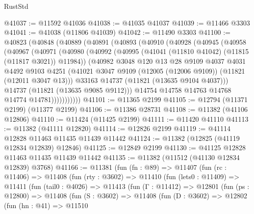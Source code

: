 \begin{lexlean}{RustStd}
\begin{coremodule}
@41037 := @11592 @41036
@41038 := @41035 @41037
@41039 := @11466 @3303
@41041 := @41038 (@11806 @41039)
@41042 := @11490 @3303
@41100 := @40823
    (@40848
      (@40889
        (@40891
          (@40893
            (@40910
              (@40928
                (@40945
                  (@40958
                    (@40967
                      (@40971
                        (@40980
                          (@40992
                            (@40995 (@41041 (@11810 @41042) (@11815 (@11817 @3021)) @11984))
                            (@40982
                              @3048
                              @120
                              @13
                              @28
                              @9109
                              @4037
                              @4031
                              @4492
                              @9103
                              @4251
                              (@41021
                                @3047
                                @9109
                                (@12005 (@12006 @9109))
                                (@11821 (@12011 @3047 @13)))
                              @33163
                              @14737
                              (@11821 (@13635 @9104 @4037)))
                            @14737
                            (@11821 (@13635 @9085 @9112)))
                          @14754
                          @14758
                          @14763
                          @14768
                          @14774
                          @14781)))))))))))
@41101 := @11365 @2199
@41105 := @12794 (@11371 @2199) (@11377 @2199)
@41106 := @11386 @28731
@41108 := @11382 (@41106 @12806)
@41110 := @11424 (@11425 @2199)
@41111 := @11420 @41110
@41113 := @11382 (@41111 @12820)
@41114 := @12826 @2199
@41119 := @41114 @12828 @11463 @11435 @11439 @11442
@41124 := @11382 (@12825 (@41119 @12834 @12839) @12846)
@41125 := @12849 @2199
@41130 := @41125 @12828 @11463 @11435 @11439 @11442
@41135 := @11382 (@11512 (@41130 @12834 @12839) @3768)
@41166 := @11381
    (fun (fn : @89) =>
    @11407
      (fun (rc : @11406) =>
      @11408
        (fun (rty : @3602) =>
        @11410
          (fun (lets0 : @11409) =>
          @11411
            (fun (tail0 : @4026) =>
            @11413
              (fun (Γ : @11412) =>
              @12801
                (fun (ps : @12800) =>
                @11408
                  (fun (S : @3602) =>
                  @11408
                    (fun (D : @3602) =>
                    @12802
                      (fun (hn : @41) =>
                      @11510

\end{coremodule}
\end{lexlean}
